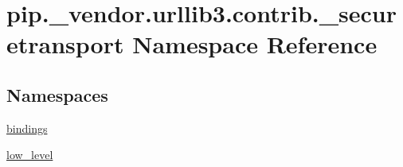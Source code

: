 \hypertarget{namespacepip_1_1__vendor_1_1urllib3_1_1contrib_1_1__securetransport}{}\section{pip.\+\_\+vendor.\+urllib3.\+contrib.\+\_\+securetransport Namespace Reference}
\label{namespacepip_1_1__vendor_1_1urllib3_1_1contrib_1_1__securetransport}
\subsection*{Namespaces}
\begin{DoxyCompactItemize}
\item 
 \hyperlink{namespacepip_1_1__vendor_1_1urllib3_1_1contrib_1_1__securetransport_1_1bindings}{bindings}
\item 
 \hyperlink{namespacepip_1_1__vendor_1_1urllib3_1_1contrib_1_1__securetransport_1_1low__level}{low\+\_\+level}
\end{DoxyCompactItemize}
